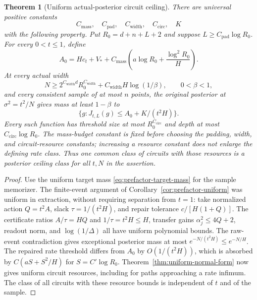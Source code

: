 \documentclass[11pt]{article}
\newtheorem{theorem}{Theorem}[section]
\theoremstyle{remark}
\begin{document}
\begin{theorem}[Uniform actual-posterior circuit ceiling]
\label{thm:uniform-ceiling}
There are universal positive constants
\[
 C_{\mathrm{mass}},\quad C_{\mathrm{pad}},\quad C_{\mathrm{width}},
 \quad C_{\mathrm{circ}},\quad K
\]
with the following property.
Put $R_0=d+n+L+2$ and suppose
$L\ge C_{\mathrm{pad}}\log R_0$.
For every $0<t\le1$, define
\[
 A_0=Hc_t+V_*+
 C_{\mathrm{mass}}\left(a\log R_0+\frac{\log^2R_0}{H}\right).
\]
At every actual width
\[
 N\ge2^{C_{\mathrm{width}}d}R_0^{C_{\mathrm{width}}}
       +C_{\mathrm{width}}H\log(1/\beta),\qquad0<\beta<1,
\]
and every consistent sample of at most $n$ points, the
original posterior at $\sigma^2=t^2/N$ gives mass at least
$1-\beta$ to
\[
 \{g:J_{t,L}(g)\le A_0+K/(t^2H)\}.
\]
Every such function has threshold size at most $R_0^{C_{\mathrm{circ}}}$
and depth at most $C_{\mathrm{circ}}\log R_0$.
The mass-budget constant is fixed before choosing the padding, width,
and circuit-resource constants; increasing a resource constant does
not enlarge the defining rate class.
Thus one common class of circuits with those resources is
a posterior ceiling class for all $t,N$ in the assertion.
\end{theorem}
\begin{proof}
Use the uniform target mass
\eqref{eq:prefactor-target-mass} for the sample memorizer.
The finite-event argument of
Corollary~\ref{cor:prefactor-uniform} was uniform in
extraction, without requiring separation from $t=1$:
take normalized action $Q=t^2A$, slack
$\tau=1/(t^2H)$, and repair tolerance
$c/[H(1+Q)]$. The certificate ratios
$A/\tau=HQ$ and $1/\tau=t^2H\le H$, transfer gains
$\alpha_j^2\le4Q+2$, readout norm, and
$\log(1/\Delta)$ all have uniform polynomial bounds.
The raw-event contradiction gives exceptional posterior
mass at most $e^{-N/(t^2H)}\le e^{-N/H}$.
The repaired rate threshold differs from $A_0$ by
$O(1/(t^2H))$, which is absorbed by
$C(aS+S^2/H)$ for $S=C'\log R_0$.
Theorem~\ref{thm:uniform-normal-form} now gives uniform
circuit resources, including for paths approaching a rate
infimum. The class of all circuits with these resource
bounds is independent of $t$ and of the sample.
\end{proof}
\end{document}

